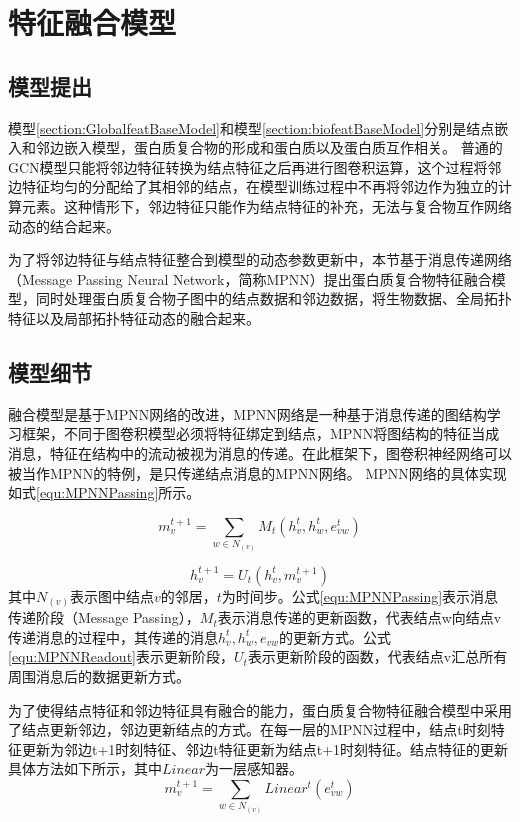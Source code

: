 \section{特征融合模型}
\label{section:fusionfeatBaseModel}
\subsection{模型提出}
\label{subsection:fusion:Modelget}

模型\ref{section:GlobalfeatBaseModel}和模型\ref{section:biofeatBaseModel}分别是结点嵌入和邻边嵌入模型，蛋白质复合物的形成和蛋白质以及蛋白质互作相关。
普通的GCN模型只能将邻边特征转换为结点特征之后再进行图卷积运算，这个过程将邻边特征均匀的分配给了其相邻的结点，在模型训练过程中不再将邻边作为独立的计算元素。这种情形下，邻边特征只能作为结点特征的补充，无法与复合物互作网络动态的结合起来。

为了将邻边特征与结点特征整合到模型的动态参数更新中，本节基于消息传递网络（Message Passing Neural Network，简称MPNN）提出蛋白质复合物特征融合模型，同时处理蛋白质复合物子图中的结点数据和邻边数据，将生物数据、全局拓扑特征以及局部拓扑特征动态的融合起来。

\subsection{模型细节}
\label{subsection:fusion:Modeldetail}

融合模型是基于MPNN网络的改进，MPNN网络是一种基于消息传递的图结构学习框架，不同于图卷积模型必须将特征绑定到结点，MPNN将图结构的特征当成消息，特征在结构中的流动被视为消息的传递。在此框架下，图卷积神经网络可以被当作MPNN的特例，是只传递结点消息的MPNN网络。
MPNN网络的具体实现如式\ref{equ:MPNNPassing}所示。

\begin{equation}
    \label{equ:MPNNPassing}
    m_v^{t+1} = \sum_{w \in N_{(v)}}M_t(h_v^t,h_w^t,e_{vw}^t)
\end{equation}

\begin{equation}
    \label{equ:MPNNReadout}
    h_v^{t+1} = U_t(h_v^t,m_v^{t+1})
\end{equation}
其中$N_{(v)}$表示图中结点$v$的邻居，$t$为时间步。公式\ref{equ:MPNNPassing}表示消息传递阶段（Message Passing），$M_t$表示消息传递的更新函数，代表结点w向结点v传递消息的过程中，其传递的消息$h_v^t,h_w^t,e_{vw}$的更新方式。公式\ref{equ:MPNNReadout}表示更新阶段，$U_t$表示更新阶段的函数，代表结点v汇总所有周围消息后的数据更新方式。

为了使得结点特征和邻边特征具有融合的能力，蛋白质复合物特征融合模型中采用了结点更新邻边，邻边更新结点的方式。在每一层的MPNN过程中，结点t时刻特征更新为邻边t+1时刻特征、邻边t特征更新为结点t+1时刻特征。结点特征的更新具体方法如下所示，其中$Linear$为一层感知器。
\begin{equation}
    \label{equ:MineMPNNPassing}
    m_v^{t+1} = \sum_{w \in N_{(v)}}Linear^t(e_{vw}^t)
\end{equation}

